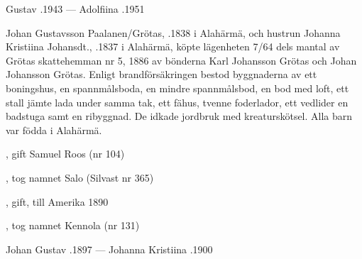 Gustav .1943  ---  Adolfiina .1951


%
Johan Gustavsson Paalanen/Grötas, .1838 i Alahärmä, och hustrun Johanna Kristiina Johansdt., .1837 i Alahärmä, köpte lägenheten 7/64 dels mantal av Grötas skattehemman  nr 5, 1886 av bönderna Karl Johansson Grötas och Johan Johansson Grötas. Enligt brandförsäkringen bestod byggnaderna av ett boningshus, en spannmålsboda, en mindre spannmålsbod, en bod med loft, ett stall jämte lada under samma tak, ett fähus, tvenne foderlador, ett vedlider en badstuga samt en ribyggnad. De idkade jordbruk med kreaturskötsel. Alla barn var födda i Alahärmä.
\begin{jhchildren}
  \item {}
  \item {}
  \item {}, gift Samuel Roos (nr 104)
  \item {}, tog namnet Salo (Silvast nr 365)
  \item {}
  \item {}, gift, till Amerika 1890
  \item {}
  \item {}, tog namnet Kennola (nr 131)
\end{jhchildren}
Johan Gustav .1897  ---  Johanna Kristiina .1900



%



